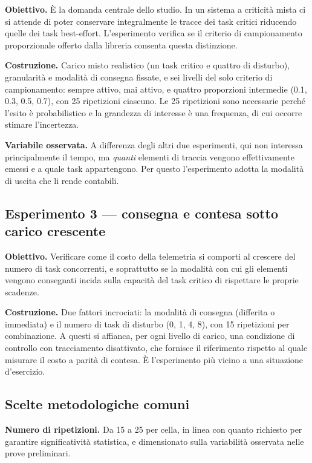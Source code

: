 \textbf{Obiettivo.} \`E la domanda centrale dello studio. In un sistema a criticit\`a mista ci si
attende di poter conservare integralmente le tracce dei task critici riducendo quelle dei task
best-effort. L'esperimento verifica se il criterio di campionamento proporzionale offerto dalla
libreria consenta questa distinzione.

\textbf{Costruzione.} Carico misto realistico (un task critico e quattro di disturbo), granularit\`a
e modalit\`a di consegna fissate, e sei livelli del solo criterio di campionamento: sempre attivo,
mai attivo, e quattro proporzioni intermedie (0.1, 0.3, 0.5, 0.7), con 25 ripetizioni ciascuno. Le
25 ripetizioni sono necessarie perch\'e l'esito \`e probabilistico e la grandezza di interesse \`e
una frequenza, di cui occorre stimare l'incertezza.

\textbf{Variabile osservata.} A differenza degli altri due esperimenti, qui non interessa
principalmente il tempo, ma \emph{quanti} elementi di traccia vengono effettivamente emessi e a
quale task appartengono. Per questo l'esperimento adotta la modalit\`a di uscita che li rende
contabili.

\subsection{Esperimento 3 --- consegna e contesa sotto carico crescente}

\textbf{Obiettivo.} Verificare come il costo della telemetria si comporti al crescere del numero di
task concorrenti, e soprattutto se la modalit\`a con cui gli elementi vengono consegnati incida
sulla capacit\`a del task critico di rispettare le proprie scadenze.

\textbf{Costruzione.} Due fattori incrociati: la modalit\`a di consegna (differita o immediata) e il
numero di task di disturbo (0, 1, 4, 8), con 15 ripetizioni per combinazione. A questi si affianca,
per ogni livello di carico, una condizione di controllo con tracciamento disattivato, che fornisce
il riferimento rispetto al quale misurare il costo a parit\`a di contesa. \`E l'esperimento pi\`u
vicino a una situazione d'esercizio.

\subsection{Scelte metodologiche comuni}

\textbf{Numero di ripetizioni.} Da 15 a 25 per cella, in linea con quanto richiesto per garantire
significativit\`a statistica, e dimensionato sulla variabilit\`a osservata nelle prove preliminari.

